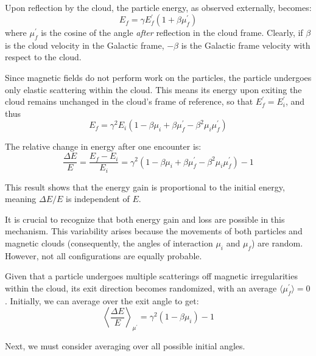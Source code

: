 Upon reflection by the cloud, the particle energy, as observed externally, becomes:
\begin{equation}
E_f  = \gamma E_f^\prime \left(1+ \beta \mu^\prime_f \right) 
\end{equation}
where \( \mu^\prime_f \) is the cosine of the angle \emph{after} reflection in the cloud frame. Clearly, if $\beta$ is the cloud velocity in the Galactic frame, $-\beta$ is the Galactic frame velocity with respect to the cloud.

Since magnetic fields do not perform work on the particles, the particle undergoes only elastic scattering within the cloud. This means its energy upon exiting the cloud remains unchanged in the cloud's frame of reference, so that \( E^\prime_f = E^\prime_i \), and thus
%
\begin{equation}
E_f = \gamma^2 E_i \left(1 - \beta \mu_i + \beta \mu^\prime_f - \beta^2 \mu_i \mu^\prime_f \right)
\end{equation}

The relative change in energy after one encounter is:
%
\begin{equation}
\frac{\Delta E}{E} = \frac{E_f - E_i}{E_i} =
\gamma^2  \left(1 - \beta \mu_i + \beta \mu^\prime_f - \beta^2 \mu_i \mu^\prime_f \right) - 1
\end{equation}

This result shows that the energy gain is proportional to the initial energy, meaning \( \Delta E/E \) is independent of \( E \).

It is crucial to recognize that both energy gain and loss are possible in this mechanism. This variability arises because the movements of both particles and magnetic clouds (consequently, the angles of interaction \( \mu_i \) and \( \mu_f \)) are random. 
%
However, not all configurations are equally probable.

Given that a particle undergoes multiple scatterings off magnetic irregularities within the cloud, its exit direction becomes randomized, with an average \( \langle \mu^\prime_f \rangle = 0 \). 
%
Initially, we can average over the exit angle to get:
%
\begin{equation}
\left\langle \frac{\Delta E}{E} \right\rangle_{\mu^\prime} = 
\gamma^2 \left( 1 - \beta \mu_i \right) - 1
\end{equation}

Next, we must consider averaging over all possible initial angles. 

